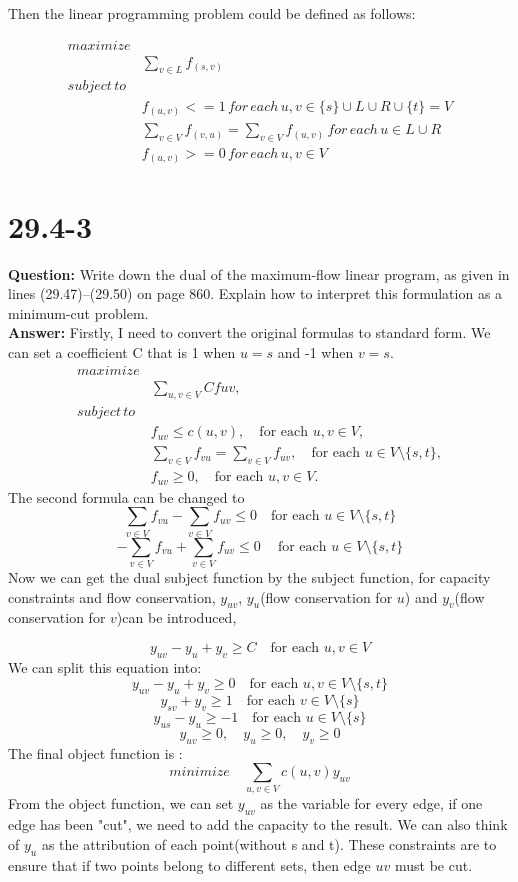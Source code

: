 \documentclass[12pt]{article}
\begin{document}
Then the linear programming problem could be defined as follows:

\begin{equation}
\begin{aligned}
maximize& \\
& \sum_{v \in L} f_{(s,v)}\\
subject \, to&  \\
& f_{(u,v)} <=1 \, for \, each \, u,v \in \{s\} \cup L \cup R \cup \{t\} = V\\ 
& \sum_{v \in V} f_{(v,u)} = \sum_{v \in V} f_{(u,v)} \, for \, each \, u \in L \cup R\\
&f_{(u,v)} >= 0 \, for \,each \, u,v \in V
\end{aligned}
\end{equation}


\section{29.4-3}
\textbf{Question:}
Write down the dual of the maximum-flow linear program, as given in lines
(29.47)–(29.50) on page 860. Explain how to interpret this formulation as a
minimum-cut problem.\\
\textbf{Answer:}
Firstly, I need to convert the original formulas to standard form.
We can set a coefficient C that is 1 when \(u=s\) and -1 when \(v=s\).
\[
\begin{aligned}
maximize& \\
&\sum_{u,v \in V} Cfuv, \\
subject \, to& \\
&f_{uv} \leq c(u, v), \quad \text{for each } u, v \in V, \\
&\sum_{v \in V} f_{vu} = \sum_{v \in V} f_{uv}, \quad \text{for each } u \in V \setminus \{s, t\}, \\
&f_{uv} \geq 0, \quad \text{for each } u, v \in V.
\end{aligned}
\]
The second formula can be changed to 
\[
\sum_{v \in V} f_{vu} - \sum_{v \in V} f_{uv} \leq 0 \quad \text{for each } u \in V \setminus \{s, t\}
\]
\[-\sum_{v \in V} f_{vu} + \sum_{v \in V} f_{uv} \leq 0\ \quad \text{for each } u \in V \setminus \{s, t\}\]
Now we can get the dual subject function by the subject function, for capacity constraints and flow conservation, \(y_{uv}\), \(y_u\)(flow conservation for \(u\)) and \(y_v\)(flow conservation for \(v\))can be introduced, 

\[y_{uv}-y_u+y_v \geq C \quad \text{for each } u, v \in V\]
We can split this equation into:
\[y_{uv}-y_u+y_v \geq 0 \quad \text{for each } u, v \in V\setminus \{s, t\}\]
\[y_{sv}+y_v \geq 1 \quad \text{for each } v \in V\setminus \{s\}\]
\[y_{us}-y_u \geq -1 \quad \text{for each } u \in V\setminus \{s\}\]
\[y_{uv} \geq 0, \quad y_u \geq 0,\quad y_v\geq 0\]
The final object function is :
\[minimize \quad \sum_{u,v \in V} c(u,v)y_{uv}\]
From the object function, we can set \(y_{uv}\) as the variable for every edge, if one edge has been "cut", we need to add the capacity to the result. We can also think of \(y_u\) as the attribution of each point(without s and t). These constraints are to ensure that if two points belong to different sets, then edge \(uv\) must be cut.
\end{document}
